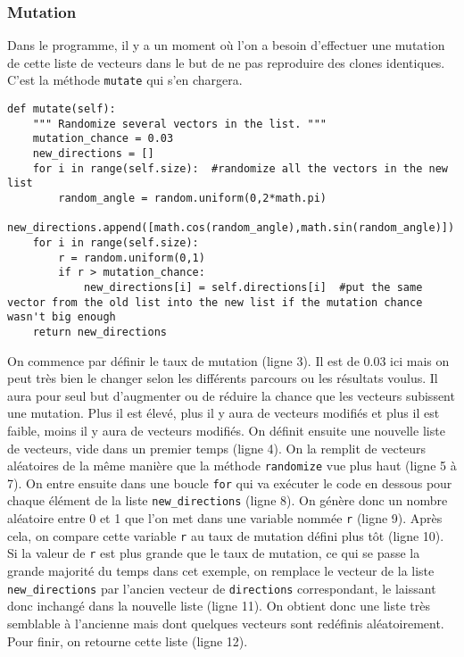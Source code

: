 \documentclass[12pt, a4paper, openany]{book}
\begin{document}
\subsubsection{Mutation}
Dans le programme, il y a un moment où l'on a besoin d'effectuer une mutation de cette liste de vecteurs dans le but de ne pas reproduire des clones identiques. C'est la méthode \verb'mutate' qui s'en chargera.
\begin{verbatim}
def mutate(self):
	""" Randomize several vectors in the list. """
	mutation_chance = 0.03
	new_directions = []
	for i in range(self.size):	#randomize all the vectors in the new list
		random_angle = random.uniform(0,2*math.pi)
		new_directions.append([math.cos(random_angle),math.sin(random_angle)])
	for i in range(self.size):
		r = random.uniform(0,1)
		if r > mutation_chance:
			new_directions[i] = self.directions[i]	#put the same vector from the old list into the new list if the mutation chance wasn't big enough
	return new_directions
\end{verbatim}
On commence par définir le taux de mutation (ligne 3). Il est de 0.03 ici mais on peut très bien le changer selon les différents parcours ou les résultats voulus. Il aura pour seul but d'augmenter ou de réduire la chance que les vecteurs subissent une mutation. Plus il est élevé, plus il y aura de vecteurs modifiés et plus il est faible, moins il y aura de vecteurs modifiés. On définit ensuite une nouvelle liste de vecteurs, vide dans un premier temps (ligne 4). On la remplit de vecteurs aléatoires de la même manière que la méthode \verb'randomize' vue plus haut (ligne 5 à 7). On entre ensuite dans une boucle \verb'for' qui va exécuter le code en dessous pour chaque élément de la liste \verb'new_directions' (ligne 8). On génère donc un nombre aléatoire entre 0 et 1 que l'on met dans une variable nommée \verb'r' (ligne 9). Après cela, on compare cette variable \verb'r' au taux de mutation défini plus tôt (ligne 10). Si la valeur de \verb'r' est plus grande que le taux de mutation, ce qui se passe la grande majorité du temps dans cet exemple, on remplace le vecteur de la liste \verb'new_directions' par l'ancien vecteur de \verb'directions' correspondant, le laissant donc inchangé dans la nouvelle liste (ligne 11). On obtient donc une liste très semblable à l'ancienne mais dont quelques vecteurs sont redéfinis aléatoirement. Pour finir, on retourne cette liste (ligne 12).
\end{document}
